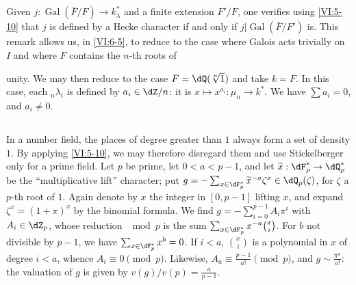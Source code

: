 \documentclass[oneside]{book}
\DeclareMathOperator{\gal}{Gal}
\newcounter{char}
\theoremstyle{sga-source}
\theoremstyle{sga-source-dash}
\theoremstyle{sga-source-dotdash}
\theoremstyle{sga-source-number-note-dash}
\theoremstyle{sga-source-note-number-dotdash}
\theoremstyle{sga-source-example-dotdash}
\theoremstyle{sga-source-inline-number}
\theoremstyle{sga-source-bare-number}
\theoremstyle{sga-source}
\newcommand{\PrintPage}[1]{}\newcommand{\MathPage}[1]{}\newcommand{\PrintCite}[2]{#1}\newcommand{\var}[3]{#2}
\begin{document}
\subsection{}\label{VI:6-6}

Given $j:\gal(\bar F/F) \to k_\lambda^\ast$ and a finite extension 
$F'/F$, one verifies using \ref{VI:5-10} that $j$ is defined by a 
Hecke character if and only if $j|\gal(\bar F/F')$ is. This 
remark allows us, in \ref{VI:6-5}, to reduce to the case where Galois acts 
trivially on $I$ and where $F$ contains the $n$-th roots of 
\PrintPage{216}
unity. We may then reduce to the case $F=\dQ(\sqrt[n]{1})$ and 
take $k=F$. In this case, each $_n \lambda_i$ is defined by 
$a_i\in \dZ/n$: it is $x\mapsto x^{a_i}:\mu_n \to k^\ast$. We have 
$\sum a_i=0$, and $a_i\ne 0$. 





\subsection{}\label{VI:6-7}

In a number field, the places of degree greater than $1$ always form \var{a set of density $0$}{a set of density $1$}{S45-SOL-0908}. By applying \ref{VI:5-10}, we may therefore disregard 
them and use Stickelberger only for a prime field. Let 
$p$ be prime, let $0<a<p-1$, and let $\widetilde x:\dF_p^\ast \to \dQ_p^\ast$ be the 
``multiplicative lift'' character; put 
  $g=-\sum_{x\in \dF_p^\ast} \widetilde x^{-a} \zeta^x\in \dQ_p(\zeta)$, for 
$\zeta$ a $p$-th root of $1$. Again denote by $x$ the integer in $[0,p-1]$ 
  lifting $x$, and expand $\zeta^x=(1+\pi)^x$ by the binomial formula. 
  We find $g=-\sum_{i=0}^{p-1} A_i\pi^i$ with $A_i\in \dZ_p$, whose reduction 
$\mod p$ is the sum $\sum_{x\in \dF_p^\ast} x^{-a} \binom x i$. For $b$ not 
divisible by $p-1$, we have $\sum_{x\in \dF_p^\ast} x^b=0$. If $i<a$, 
$\binom x i$ is a polynomial in $x$ of degree $i<a$, whence 
$A_i\equiv 0\pmod p$. Likewise, $A_a\equiv \frac{p-1}{a!} \pmod p$, and 
$g\sim \frac{\pi^a}{a!}$: the valuation of $g$ is given by 
$v(g)/v(p) = \frac{a}{p-1}$. 





\subsection{}\label{VI:6-8}
\end{document}
